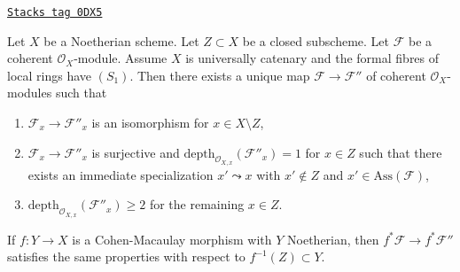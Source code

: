 \begin{lemma}
\label{local-cohomology-lemma-make-S2-along-Z}
\href{https://stacks.math.columbia.edu/tag/0DX5}{\texttt{Stacks tag 0DX5}}

Let $X$ be a Noetherian scheme. Let $Z \subset X$ be a closed subscheme.
Let $\mathcal{F}$ be a coherent $\mathcal{O}_X$-module. Assume
$X$ is universally catenary and the formal fibres of local rings have $(S_1)$.
Then there exists a unique map $\mathcal{F} \to \mathcal{F}''$
of coherent $\mathcal{O}_X$-modules such that
\begin{enumerate}
\item $\mathcal{F}_x \to \mathcal{F}''_x$
is an isomorphism for $x \in X \setminus Z$,
\item $\mathcal{F}_x \to \mathcal{F}''_x$ is surjective and
$\text{depth}_{\mathcal{O}_{X, x}}(\mathcal{F}''_x) = 1$
for $x \in Z$ such that there exists an immediate specialization
$x' \leadsto x$ with $x' \not \in Z$ and $x' \in \text{Ass}(\mathcal{F})$,
\item $\text{depth}_{\mathcal{O}_{X, x}}(\mathcal{F}''_x) \geq 2$
for the remaining $x \in Z$.
\end{enumerate}
If $f : Y \to X$ is a Cohen-Macaulay morphism with $Y$ Noetherian,
then $f^*\mathcal{F} \to f^*\mathcal{F}''$ satisfies the same properties
with respect to $f^{-1}(Z) \subset Y$.
\end{lemma}

